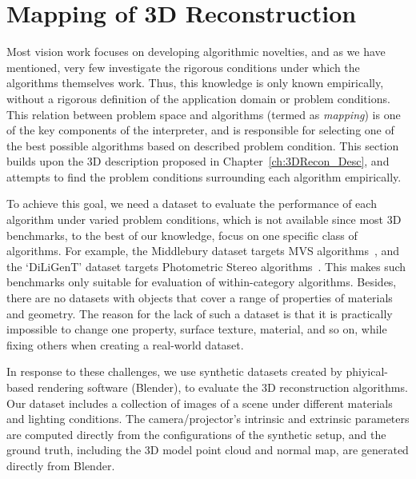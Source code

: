 
\chapter{Mapping of 3D Reconstruction}
\label{ch:3DRecon_Mapping}
Most vision work focuses on developing algorithmic novelties, and as we have mentioned, very few investigate the rigorous conditions under which the algorithms themselves work. Thus, this knowledge is only known empirically, without a rigorous definition of the application domain or problem conditions. This relation between problem space and algorithms (termed as \textit{mapping}) is one of the key components of the interpreter, and is responsible for selecting one of the best possible algorithms based on described problem condition. This section builds upon the 3D description proposed in Chapter~\ref{ch:3DRecon_Desc}, and attempts to find the problem conditions surrounding each algorithm empirically. 

To achieve this goal, we need a dataset to evaluate the performance of each algorithm under varied problem conditions, which is not available since most 3D benchmarks, to the best of our knowledge, focus on one specific class of algorithms. For example, the Middlebury dataset targets MVS algorithms~\cite{seitz2006comparison}, and the `DiLiGenT' dataset targets Photometric Stereo algorithms~\cite{shi2016benchmark}. This makes such benchmarks only suitable for evaluation of within-category algorithms. Besides, there are no datasets with objects that cover a range of properties of materials and geometry. The reason for the lack of such a dataset is that it is practically impossible to change one property, \eg surface texture, material, and so on, while fixing others when creating a real-world dataset.

In response to these challenges, we use synthetic datasets created by phiyical-based rendering software (Blender), to evaluate the 3D reconstruction algorithms. Our dataset includes a collection of images of a scene under different materials and lighting conditions. The camera/projector's intrinsic and extrinsic parameters are computed directly from the configurations of the synthetic setup, and the ground truth, including the 3D model point cloud and normal map, are generated directly from Blender.

